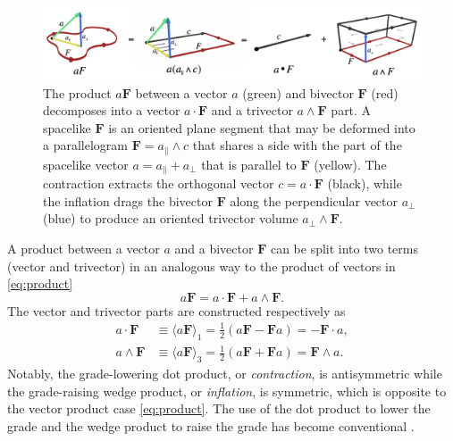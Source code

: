 \documentclass[1p,sort&compress]{elsarticle}
\numberwithin{equation}{section}
\newcommand{\bv}[1]{\mathbf{#1}}
\newcommand{\mean}[1]{\langle #1 \rangle}
\begin{document}
\begin{figure}[t]
  \begin{center}
    \includegraphics[width=\columnwidth]{Fig3.png}
  \end{center}
  \caption[Vector-bivector product]{The product $a \bv{F}$ between a vector $a$ (green) and bivector $\bv{F}$ (red) decomposes into a vector $a\cdot \bv{F}$ and a trivector $a\wedge \bv{F}$ part.  A spacelike $\bv{F}$ is an oriented plane segment that may be deformed into a parallelogram $\bv{F} = a_\parallel \wedge c$ that shares a side with the part of the spacelike vector $a = a_\parallel + a_\perp$ that is parallel to $\bv{F}$ (yellow).  The contraction extracts the orthogonal vector $c = a\cdot \bv{F}$ (black), while the inflation drags the bivector $\bv{F}$ along the perpendicular vector $a_\perp$ (blue) to produce an oriented trivector volume $a_\perp \wedge \bv{F}$. }
  \label{fig:bivectorproduct}
\end{figure}

A product between a vector $a$ and a bivector $\bv{F}$ can be split into two terms (vector and trivector) in an analogous way to the product of vectors in \eqref{eq:product} 
\begin{equation}\label{eq:productvecbi}
  a \bv{F} = a \cdot \bv{F} + a \wedge \bv{F}.
\end{equation}
The vector and trivector parts are constructed respectively as
\begin{align}\label{eq:dotwedgebivector}
  a\cdot \bv{F} &\equiv \mean{a\bv{F}}_1 = \frac{1}{2}(a\bv{F} - \bv{F}a) = -\bv{F} \cdot a, \\
  a\wedge \bv{F} &\equiv \mean{a\bv{F}}_3 = \frac{1}{2}(a\bv{F} + \bv{F}a) = \bv{F} \wedge a.
\end{align}
Notably, the grade-lowering dot product, or \emph{contraction}, is antisymmetric while the grade-raising wedge product, or \emph{inflation}, is symmetric, which is opposite to the vector product case \eqref{eq:product}.  The use of the dot product to lower the grade and the wedge product to raise the grade has become conventional \cite{Hestenes1987}.
\end{document}
